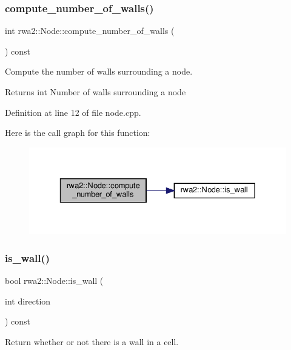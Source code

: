\subsubsection{\texorpdfstring{compute\+\_\+number\+\_\+of\+\_\+walls()}{compute\_number\_of\_walls()}}
{\footnotesize\ttfamily int rwa2\+::\+Node\+::compute\+\_\+number\+\_\+of\+\_\+walls (\begin{DoxyParamCaption}{ }\end{DoxyParamCaption}) const}



Compute the number of walls surrounding a node. 

\begin{DoxyReturn}{Returns}
int Number of walls surrounding a node 
\end{DoxyReturn}


Definition at line 12 of file node.\+cpp.

Here is the call graph for this function\+:
\nopagebreak
\begin{figure}[H]
\begin{center}
\leavevmode
\includegraphics[width=329pt]{classrwa2_1_1_node_a6057b0b97f6b815a57aad534cd021674_cgraph}
\end{center}
\end{figure}
\mbox{\label{classrwa2_1_1_node_acd6ab64157b7b60bea708ddb52ddb1a8}} 
\subsubsection{\texorpdfstring{is\+\_\+wall()}{is\_wall()}}
{\footnotesize\ttfamily bool rwa2\+::\+Node\+::is\+\_\+wall (\begin{DoxyParamCaption}\item[{int}]{direction }\end{DoxyParamCaption}) const}



Return whether or not there is a wall in a cell. 


